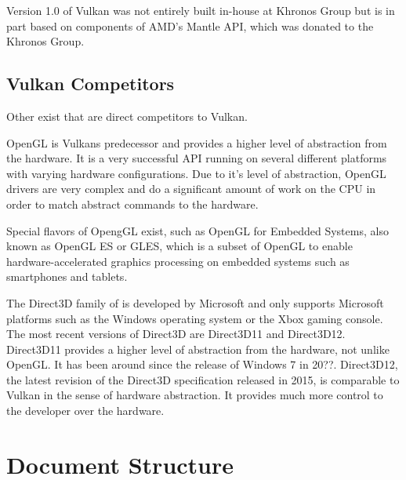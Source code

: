     Version 1.0 of Vulkan was not entirely built in-house at Khronos Group but is in part based on components of AMD's Mantle API, which was donated to the Khronos Group.


    \subsection{Vulkan Competitors}

      Other  exist that are direct competitors to Vulkan.

      OpenGL is Vulkans predecessor and provides a higher level of abstraction from the hardware. It is a very successful API running on several different platforms with varying hardware configurations. Due to it's level of abstraction, OpenGL drivers are very complex and do a significant amount of work on the CPU in order to match abstract commands to the hardware.

      Special flavors of OpengGL exist, such as OpenGL for Embedded Systems, also known as OpenGL ES or GLES, which is a subset of OpenGL to enable hardware-accelerated graphics processing on embedded systems such as smartphones and tablets.

      The Direct3D family of  is developed by Microsoft and only supports Microsoft platforms such as the Windows operating system or the Xbox gaming console. The most recent versions of Direct3D are Direct3D11 and Direct3D12. Direct3D11 provides a higher level of abstraction from the hardware, not unlike OpenGL. It has been around since the release of Windows 7 in 20??. Direct3D12, the latest revision of the Direct3D specification released in 2015, is comparable to Vulkan in the sense of hardware abstraction. It provides much more control to the developer over the hardware.





  \section{Document Structure}

    \lipsum
